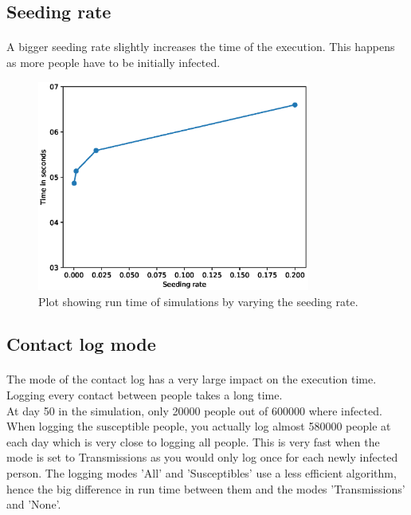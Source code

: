 \documentclass[runningheads]{llncs}
\begin{document}
\subsection{Seeding rate}

\paragraph{} A bigger seeding rate slightly increases the time of the execution. This happens as more people have to be initially infected.
\begin{figure}[h!]
\centering
	\includegraphics[width=0.8\textwidth]{3_GProf_seedingrate.eps}
	\caption{Plot showing run time of simulations by varying the seeding rate.} 
	\label{Gprof_seedingrate}
\end{figure}

\subsection{Contact log mode}

\paragraph{} The mode of the contact log has a very large impact on the execution time. Logging every contact between people takes a long time.\\
At day 50 in the simulation, only 20000 people out of 600000 where infected. When logging the susceptible people, you actually log almost 580000 people at each day which is very close to logging all people. This is very fast when the mode is set to Transmissions as you would only log once for each newly infected person. The logging modes 'All' and 'Susceptibles' use a less efficient algorithm, hence the big difference in run time between them and the modes 'Transmissions' and 'None'.\\
\end{document}
